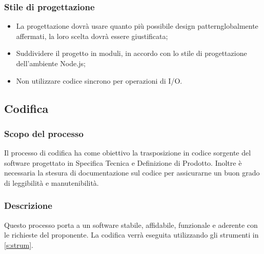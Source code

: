 \documentclass[a4paper,11pt]{article}
\begin{document}
			\subsubsection{Stile di progettazione}
				\begin{itemize}
				\item La progettazione dovrà usare quanto più possibile design pattern\addglos globalmente affermati, la loro scelta dovrà essere giustificata;
				\item Suddividere il progetto in moduli, in accordo con lo stile di progettazione dell'ambiente Node.js\addglos;
				\item Non utilizzare codice sincrono per operazioni di I/O\addglos.
				
				\end{itemize}
			
			
		\subsection{Codifica}
			\subsubsection{Scopo del processo}
			Il processo di codifica ha come obiettivo la trasposizione in codice sorgente del software progettato in Specifica Tecnica e Definizione di Prodotto. Inoltre è necessaria la stesura di documentazione sul codice per assicurarne un buon grado di leggibilità e manutenibilità.
			\subsubsection{Descrizione}		
				Questo processo porta a un software stabile, affidabile, funzionale e aderente con le richieste del proponente. La codifica verrà eseguita utilizzando gli strumenti in \ref{s:strum}.
			
\end{document}
